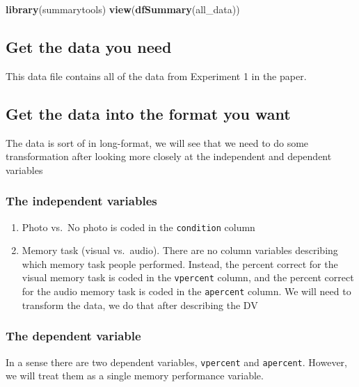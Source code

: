\documentclass[]{book}
\newenvironment{Shaded}{\begin{snugshade}}{\end{snugshade}}
\newcommand{\KeywordTok}[1]{\textcolor[rgb]{0.13,0.29,0.53}{\textbf{#1}}}
\newcommand{\NormalTok}[1]{#1}
\providecommand{\tightlist}{%
  \setlength{\itemsep}{0pt}\setlength{\parskip}{0pt}}
\begin{document}
\begin{Shaded}
\begin{Highlighting}[]
\KeywordTok{library}\NormalTok{(summarytools)}
\KeywordTok{view}\NormalTok{(}\KeywordTok{dfSummary}\NormalTok{(all_data))}
\end{Highlighting}
\end{Shaded}

\subsection{Get the data you need}\label{get-the-data-you-need-3}

This data file contains all of the data from Experiment 1 in the paper.

\subsection{Get the data into the format you
want}\label{get-the-data-into-the-format-you-want-1}

The data is sort of in long-format, we will see that we need to do some
transformation after looking more closely at the independent and
dependent variables

\subsubsection{The independent
variables}\label{the-independent-variables-1}

\begin{enumerate}
\def\labelenumi{\arabic{enumi}.}
\tightlist
\item
  Photo vs.~No photo is coded in the \texttt{condition} column
\item
  Memory task (visual vs.~audio). There are no column variables
  describing which memory task people performed. Instead, the percent
  correct for the visual memory task is coded in the \texttt{vpercent}
  column, and the percent correct for the audio memory task is coded in
  the \texttt{apercent} column. We will need to transform the data, we
  do that after describing the DV
\end{enumerate}

\subsubsection{The dependent variable}\label{the-dependent-variable-1}

In a sense there are two dependent variables, \texttt{vpercent} and
\texttt{apercent}. However, we will treat them as a single memory
performance variable.
\end{document}
